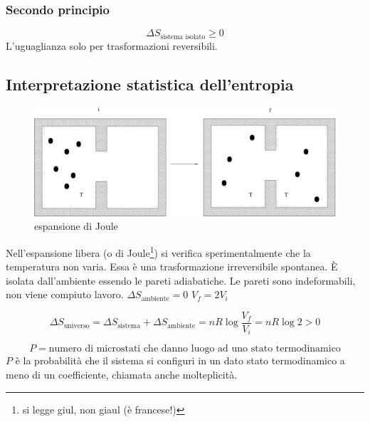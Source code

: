 \subsubsection{Secondo principio}
\begin{equation*}\Delta S_\text{sistema isolato}\geq 0\end{equation*}
L'uguaglianza solo per trasformazioni reversibili.


\subsection{Interpretazione statistica dell'entropia}
\begin{figure}[htbp]
\centering
\includegraphics[scale=0.45]{immagini/fisica1/exp_Joule}
\caption{espansione di Joule}
\end{figure}

Nell'espansione libera (o di Joule\footnote{si legge giul, non giaul (è francese!)}) si verifica sperimentalmente che la temperatura non varia. Essa è una trasformazione irreversibile spontanea. \`E isolata dall'ambiente essendo le pareti adiabatiche. Le pareti sono indeformabili, non viene compiuto lavoro. $\Delta S_\text{ambiente}=0$ $V_f=2V_i$

\begin{equation*}\Delta S_\text{universo}=\Delta S_\text{sistema}+\Delta S_\text{ambiente}=nR\log\frac{V_f}{V_i}=nR\log 2>0\end{equation*}

\begin{equation*}P=\text{numero di microstati che danno luogo ad uno stato termodinamico}\end{equation*}
$P$ è la probabilità che il sistema si configuri in un dato stato termodinamico a meno di un coefficiente, chiamata anche molteplicità.

